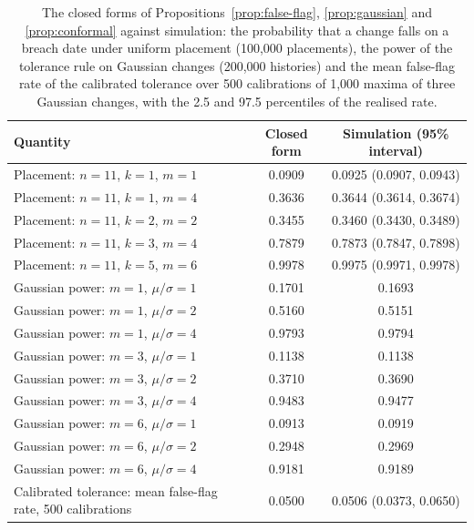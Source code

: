 \begin{table}[htbp]
\centering
\footnotesize
\caption{The closed forms of Propositions~\ref{prop:false-flag}, \ref{prop:gaussian} and \ref{prop:conformal} against simulation: the probability that a change falls on a breach date under uniform placement (100,000 placements), the power of the tolerance rule on Gaussian changes (200,000 histories) and the mean false-flag rate of the calibrated tolerance over 500 calibrations of 1,000 maxima of three Gaussian changes, with the 2.5 and 97.5 percentiles of the realised rate.}
\label{tab:theory-checks}
\begin{tabular}{lcc}
\toprule
Quantity & Closed form & Simulation (95\% interval) \\
\midrule
\relax Placement: $n=11$, $k=1$, $m=1$ & 0.0909 & 0.0925 (0.0907, 0.0943) \\
\relax Placement: $n=11$, $k=1$, $m=4$ & 0.3636 & 0.3644 (0.3614, 0.3674) \\
\relax Placement: $n=11$, $k=2$, $m=2$ & 0.3455 & 0.3460 (0.3430, 0.3489) \\
\relax Placement: $n=11$, $k=3$, $m=4$ & 0.7879 & 0.7873 (0.7847, 0.7898) \\
\relax Placement: $n=11$, $k=5$, $m=6$ & 0.9978 & 0.9975 (0.9971, 0.9978) \\
\relax Gaussian power: $m=1$, $\mu/\sigma=1$ & 0.1701 & 0.1693 \\
\relax Gaussian power: $m=1$, $\mu/\sigma=2$ & 0.5160 & 0.5151 \\
\relax Gaussian power: $m=1$, $\mu/\sigma=4$ & 0.9793 & 0.9794 \\
\relax Gaussian power: $m=3$, $\mu/\sigma=1$ & 0.1138 & 0.1138 \\
\relax Gaussian power: $m=3$, $\mu/\sigma=2$ & 0.3710 & 0.3690 \\
\relax Gaussian power: $m=3$, $\mu/\sigma=4$ & 0.9483 & 0.9477 \\
\relax Gaussian power: $m=6$, $\mu/\sigma=1$ & 0.0913 & 0.0919 \\
\relax Gaussian power: $m=6$, $\mu/\sigma=2$ & 0.2948 & 0.2969 \\
\relax Gaussian power: $m=6$, $\mu/\sigma=4$ & 0.9181 & 0.9189 \\
Calibrated tolerance: mean false-flag rate, 500 calibrations & 0.0500 & 0.0506 (0.0373, 0.0650) \\
\bottomrule
\end{tabular}
\end{table}
